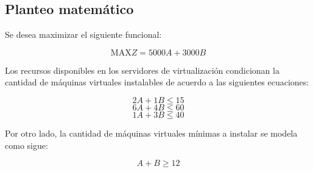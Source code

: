 \documentclass[a4paper,11pt]{article}
\begin{document}
\FloatBarrier

\subsection{Planteo matemático}

Se desea maximizar el siguiente funcional:

\[
  \text{MAX} Z = 5000 A + 3000 B
\]

Los recursos disponibles en los servidores de virtualización condicionan la
cantidad de máquinas virtuales instalables de acuerdo a las siguientes
ecuaciones:

\begin{equation}
  2 A + 1 B \leq 15
\end{equation}
\begin{equation}
  6 A + 4 B \leq 60
\end{equation}
\begin{equation}
  1 A + 3 B \leq 40
\end{equation}

Por otro lado, la cantidad de máquinas virtuales mínimas a instalar se modela
como sigue:

\begin{equation}
  A + B \geq 12
\end{equation}
\end{document}
